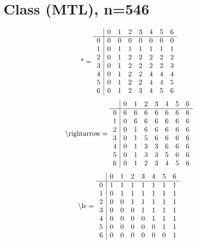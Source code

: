 \documentclass[11pt]{article}
\begin{document}
\section{Class (MTL), n=546}
\[\text{*} = 
\begin{array}{r | r r r r r r r}
 & 0 & 1 & 2 & 3 & 4 & 5 & 6 \\ \hline
0 & 0 & 0 & 0 & 0 & 0 & 0 & 0 \\
1 & 0 & 1 & 1 & 1 & 1 & 1 & 1 \\
2 & 0 & 1 & 2 & 2 & 2 & 2 & 2 \\
3 & 0 & 1 & 2 & 2 & 2 & 2 & 3 \\
4 & 0 & 1 & 2 & 2 & 4 & 4 & 4 \\
5 & 0 & 1 & 2 & 2 & 4 & 4 & 5 \\
6 & 0 & 1 & 2 & 3 & 4 & 5 & 6 \\
\end{array}
\]
\[\text{\textbackslash rightarrow} = 
\begin{array}{r | r r r r r r r}
 & 0 & 1 & 2 & 3 & 4 & 5 & 6 \\ \hline
0 & 6 & 6 & 6 & 6 & 6 & 6 & 6 \\
1 & 0 & 6 & 6 & 6 & 6 & 6 & 6 \\
2 & 0 & 1 & 6 & 6 & 6 & 6 & 6 \\
3 & 0 & 1 & 5 & 6 & 6 & 6 & 6 \\
4 & 0 & 1 & 3 & 3 & 6 & 6 & 6 \\
5 & 0 & 1 & 3 & 3 & 5 & 6 & 6 \\
6 & 0 & 1 & 2 & 3 & 4 & 5 & 6 \\
\end{array}
\]
\[\text{\textbackslash le} = 
\begin{array}{r | r r r r r r r}
 & 0 & 1 & 2 & 3 & 4 & 5 & 6 \\ \hline
0 & 1 & 1 & 1 & 1 & 1 & 1 & 1 \\
1 & 0 & 1 & 1 & 1 & 1 & 1 & 1 \\
2 & 0 & 0 & 1 & 1 & 1 & 1 & 1 \\
3 & 0 & 0 & 0 & 1 & 1 & 1 & 1 \\
4 & 0 & 0 & 0 & 0 & 1 & 1 & 1 \\
5 & 0 & 0 & 0 & 0 & 0 & 1 & 1 \\
6 & 0 & 0 & 0 & 0 & 0 & 0 & 1 \\
\end{array}
\]
\end{document}
